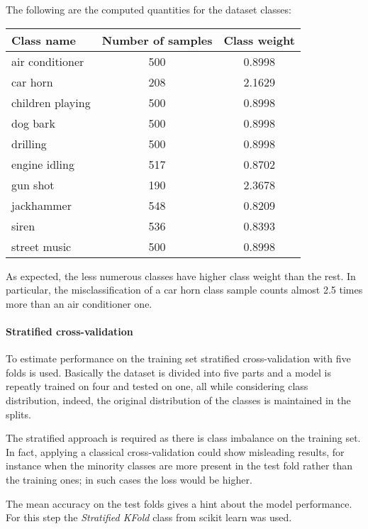 The following are the computed quantities for the dataset classes:
\begin{center}
    \begin{tabular}{ |l|c|c| } 
        \hline
        Class name & Number of samples & Class weight \\
        \hline
        air conditioner & 500 & 0.8998 \\
        car horn & 208 & 2.1629 \\
        children playing & 500 & 0.8998 \\
        dog bark & 500 & 0.8998 \\
        drilling & 500 & 0.8998 \\
        engine idling & 517 & 0.8702 \\
        gun shot & 190 & 2.3678 \\
        jackhammer & 548 & 0.8209 \\
        siren & 536 & 0.8393 \\
        street music & 500 & 0.8998 \\
        \hline
    \end{tabular}
\end{center}
As expected, the less numerous classes have higher class weight than the rest. 
In particular, the misclassification of a car horn class sample
counts almost 2.5 times more than an air conditioner one.

\paragraph{Stratified cross-validation}
To estimate performance on the training set stratified cross-validation with 
five folds is used. Basically the dataset is divided into five parts 
and a model is repeatly trained on four and tested on one, all while considering class 
distribution, indeed, the original distribution of the classes is maintained 
in the splits.~\cite{stratified}

The stratified approach is required as there is class imbalance on the training set.
In fact, applying a classical cross-validation could show misleading results, 
for instance when the minority classes are more present 
in the test fold rather than the training ones; in such cases the loss would be 
higher.

The mean accuracy on the test folds gives a hint about the model performance.
For this step the \emph{Stratified KFold} class from scikit learn was used.~\cite{cross-scikit}

